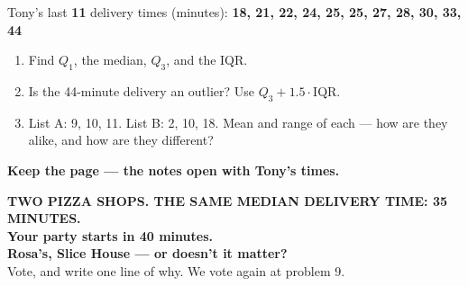 \documentclass[aspectratio=169, 11pt]{beamer}
\begin{document}
\begin{frame}[t, plain]
  \vspace{0.3cm}
  \begin{center}
    \begin{minipage}{0.86\textwidth}
      Tony's last \textbf{11} delivery times (minutes):
      \textbf{18, 21, 22, 24, 25, 25, 27, 28, 30, 33, 44}
      \begin{enumerate}\setlength{\itemsep}{7pt}
        \item Find $Q_1$, the median, $Q_3$, and the IQR.
        \item Is the 44-minute delivery an outlier? Use $Q_3 + 1.5 \cdot \text{IQR}$.
        \item List A: 9, 10, 11. List B: 2, 10, 18. Mean and range of each --- how are they
              alike, and how are they different?
      \end{enumerate}
    \end{minipage}
  \end{center}
  \vspace{0.3cm}
  \begin{center}
    {\color{cerulean}\bfseries Keep the page --- the notes open with Tony's times.}
  \end{center}
\end{frame}

{
\begin{frame}[plain]
  \vspace{1.3cm}
  \begin{center}
    {\color{frostmid}\bfseries\small TWO PIZZA SHOPS. THE SAME MEDIAN DELIVERY TIME: 35 MINUTES.}\\[0.8cm]
    {\color{white}\bfseries\Large Your party starts in 40 minutes.}\\[0.9cm]
    {\color{goldacc}\bfseries\large Rosa's, Slice House --- or doesn't it matter?}\\[0.5cm]
    {\color{frostmid}\small Vote, and write one line of why. We vote again at problem 9.}
  \end{center}
\end{frame}
}
\end{document}
